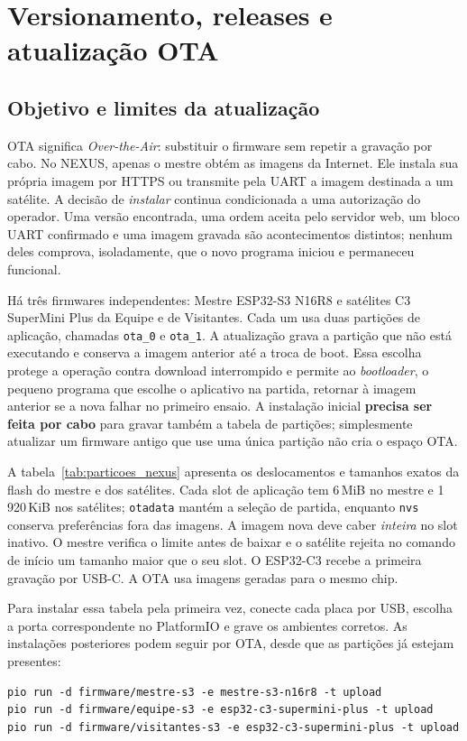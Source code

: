 \chapter{Versionamento, releases e atualização OTA}\label{cap:ota}

\section{Objetivo e limites da atualização}
OTA significa \emph{Over-the-Air}: substituir o firmware sem repetir a gravação por cabo. No NEXUS, apenas o mestre obtém as imagens da Internet. Ele instala sua própria imagem por HTTPS ou transmite pela UART a imagem destinada a um satélite. A decisão de \emph{instalar} continua condicionada a uma autorização do operador. Uma versão encontrada, uma ordem aceita pelo servidor web, um bloco UART confirmado e uma imagem gravada são acontecimentos distintos; nenhum deles comprova, isoladamente, que o novo programa iniciou e permaneceu funcional.

Há três firmwares independentes: Mestre ESP32-S3 N16R8 e satélites C3 SuperMini Plus da Equipe e de Visitantes. Cada um usa duas partições de aplicação, chamadas \texttt{ota\_0} e \texttt{ota\_1}. A atualização grava a partição que não está executando e conserva a imagem anterior até a troca de boot. Essa escolha protege a operação contra download interrompido e permite ao \emph{bootloader}, o pequeno programa que escolhe o aplicativo na partida, retornar à imagem anterior se a nova falhar no primeiro ensaio. A instalação inicial \textbf{precisa ser feita por cabo} para gravar também a tabela de partições; simplesmente atualizar um firmware antigo que use uma única partição não cria o espaço OTA.

A tabela~\ref{tab:particoes_nexus} apresenta os deslocamentos e tamanhos exatos da flash do mestre e dos satélites. Cada slot de aplicação tem 6\,MiB no mestre e 1\,920\,KiB nos satélites; \texttt{otadata} mantém a seleção de partida, enquanto \texttt{nvs} conserva preferências fora das imagens. A imagem nova deve caber \emph{inteira} no slot inativo. O mestre verifica o limite antes de baixar e o satélite rejeita no comando de início um tamanho maior que o seu slot. O ESP32-C3 recebe a primeira gravação por USB-C. A OTA usa imagens geradas para o mesmo chip.

Para instalar essa tabela pela primeira vez, conecte cada placa por USB, escolha a porta correspondente no PlatformIO e grave os ambientes corretos. As instalações posteriores podem seguir por OTA, desde que as partições já estejam presentes:
\begin{lstlisting}[caption={Primeira gravação com a tabela de partições OTA}]
pio run -d firmware/mestre-s3 -e mestre-s3-n16r8 -t upload
pio run -d firmware/equipe-s3 -e esp32-c3-supermini-plus -t upload
pio run -d firmware/visitantes-s3 -e esp32-c3-supermini-plus -t upload
\end{lstlisting}

